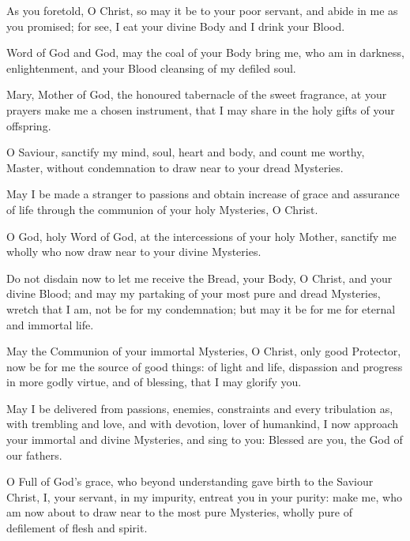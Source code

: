 
As you foretold, O Christ, so may it be to your poor servant, and abide in me as you promised; for see, I eat your divine Body and I drink your Blood.

Word of God and God, may the coal of your Body bring me, who am in darkness, enlightenment, and your Blood cleansing of my defiled soul.

\theotokion

Mary, Mother of God, the honoured tabernacle of the sweet fragrance, at your prayers make me a chosen instrument, that I may share in the holy gifts of your offspring.


O Saviour, sanctify my mind, soul, heart and body, and count me worthy, Master, without condemnation to draw near to your dread Mysteries.

May I be made a stranger to passions and obtain increase of grace and assurance of life through the communion of your holy Mysteries, O Christ.

\theotokion

O God, holy Word of God, at the intercessions of your holy Mother, sanctify me wholly who now draw near to your divine Mysteries.


Do not disdain now to let me receive the Bread, your Body, O Christ, and your divine Blood; and may my partaking of your most pure and dread Mysteries, wretch that I am, not be for my condemnation; but may it be for me for eternal and immortal life.


May the Communion of your immortal Mysteries, O Christ, only good Protector, now be for me the source of good things: of light and life, dispassion and progress in more godly virtue, and of blessing, that I may glorify you.

May I be delivered from passions, enemies, constraints and every tribulation as, with trembling and love, and with devotion, lover of humankind, I now approach your immortal and divine Mysteries, and sing to you: Blessed are you, the God of our fathers.

\theotokion

O Full of God's grace, who beyond understanding gave birth to the Saviour Christ, I, your servant, in my impurity, entreat you in your purity: make me, who am now about to draw near to the most pure Mysteries, wholly pure of defilement of flesh and spirit.

